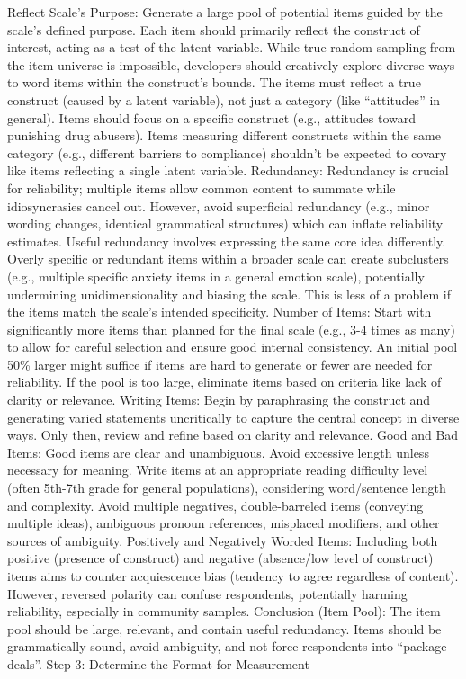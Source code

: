 \documentclass[
]{article}
\begin{document}
Reflect Scale's Purpose: Generate a large pool of potential items guided
by the scale's defined purpose. Each item should primarily reflect the
construct of interest, acting as a test of the latent variable. While
true random sampling from the item universe is impossible, developers
should creatively explore diverse ways to word items within the
construct's bounds. The items must reflect a true construct (caused by a
latent variable), not just a category (like ``attitudes'' in general).
Items should focus on a specific construct (e.g., attitudes toward
punishing drug abusers). Items measuring different constructs within the
same category (e.g., different barriers to compliance) shouldn't be
expected to covary like items reflecting a single latent variable.
Redundancy: Redundancy is crucial for reliability; multiple items allow
common content to summate while idiosyncrasies cancel out. However,
avoid superficial redundancy (e.g., minor wording changes, identical
grammatical structures) which can inflate reliability estimates. Useful
redundancy involves expressing the same core idea differently. Overly
specific or redundant items within a broader scale can create
subclusters (e.g., multiple specific anxiety items in a general emotion
scale), potentially undermining unidimensionality and biasing the scale.
This is less of a problem if the items match the scale's intended
specificity. Number of Items: Start with significantly more items than
planned for the final scale (e.g., 3-4 times as many) to allow for
careful selection and ensure good internal consistency. An initial pool
50\% larger might suffice if items are hard to generate or fewer are
needed for reliability. If the pool is too large, eliminate items based
on criteria like lack of clarity or relevance. Writing Items: Begin by
paraphrasing the construct and generating varied statements uncritically
to capture the central concept in diverse ways. Only then, review and
refine based on clarity and relevance. Good and Bad Items: Good items
are clear and unambiguous. Avoid excessive length unless necessary for
meaning. Write items at an appropriate reading difficulty level (often
5th-7th grade for general populations), considering word/sentence length
and complexity. Avoid multiple negatives, double-barreled items
(conveying multiple ideas), ambiguous pronoun references, misplaced
modifiers, and other sources of ambiguity. Positively and Negatively
Worded Items: Including both positive (presence of construct) and
negative (absence/low level of construct) items aims to counter
acquiescence bias (tendency to agree regardless of content). However,
reversed polarity can confuse respondents, potentially harming
reliability, especially in community samples. Conclusion (Item Pool):
The item pool should be large, relevant, and contain useful redundancy.
Items should be grammatically sound, avoid ambiguity, and not force
respondents into ``package deals''. Step 3: Determine the Format for
Measurement
\end{document}
